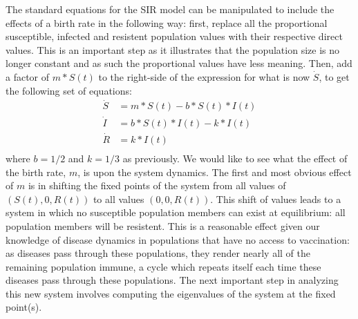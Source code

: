 \documentclass{article}
\begin{document}
The standard equations for the SIR model can be manipulated to include the effects of a birth rate in the following way: first, replace all the proportional susceptible, infected and resistent population values with their respective direct values. This is an important step as it illustrates that the population size is no longer constant and as such the proportional values have less meaning. Then, add a factor of $m*S(t)$ to the right-side of the expression for what is now $\dot{S}$, to get the following set of equations:
\begin{align*}
    \dot{S} &= m*S(t)-b*S(t)*I(t)  \\
    \dot{I} &= b*S(t)*I(t)-k*I(t) \\
    \dot{R} &= k*I(t) \\
\end{align*}
where $b=1/2$ and $k=1/3$ as previously. We would like to see what the effect of the birth rate, $m$, is upon the system dynamics. The first and most obvious effect of $m$ is in shifting the fixed points of the system from all values of $(S(t),0,R(t))$ to all values $(0,0,R(t))$. This shift of values leads to a system in which no susceptible population members can exist at equilibrium: all population members will be resistent. This is a reasonable effect given our knowledge of disease dynamics in populations that have no access to vaccination: as diseases pass through these populations, they render nearly all of the remaining population immune, a cycle which repeats itself each time these diseases pass through these populations. The next important step in analyzing this new system involves computing the eigenvalues of the system at the fixed point(s). 
\end{document}
